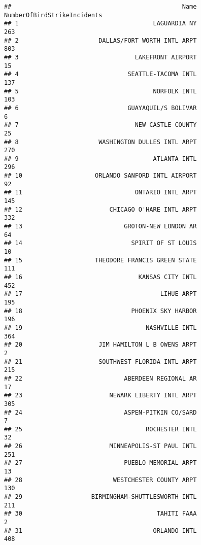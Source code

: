 \documentclass[
]{article}
\begin{document}
\begin{verbatim}
##                                               Name NumberOfBirdStrikeIncidents
## 1                                     LAGUARDIA NY                         263
## 2                      DALLAS/FORT WORTH INTL ARPT                         803
## 3                                LAKEFRONT AIRPORT                          15
## 4                              SEATTLE-TACOMA INTL                         137
## 5                                     NORFOLK INTL                         103
## 6                              GUAYAQUIL/S BOLIVAR                           6
## 7                                NEW CASTLE COUNTY                          25
## 8                      WASHINGTON DULLES INTL ARPT                         270
## 9                                     ATLANTA INTL                         296
## 10                    ORLANDO SANFORD INTL AIRPORT                          92
## 11                               ONTARIO INTL ARPT                         145
## 12                        CHICAGO O'HARE INTL ARPT                         332
## 13                            GROTON-NEW LONDON AR                          64
## 14                              SPIRIT OF ST LOUIS                          10
## 15                    THEODORE FRANCIS GREEN STATE                         111
## 16                                KANSAS CITY INTL                         452
## 17                                      LIHUE ARPT                         195
## 18                              PHOENIX SKY HARBOR                         196
## 19                                  NASHVILLE INTL                         364
## 20                     JIM HAMILTON L B OWENS ARPT                           2
## 21                     SOUTHWEST FLORIDA INTL ARPT                         215
## 22                            ABERDEEN REGIONAL AR                          17
## 23                        NEWARK LIBERTY INTL ARPT                         305
## 24                            ASPEN-PITKIN CO/SARD                           7
## 25                                  ROCHESTER INTL                          32
## 26                        MINNEAPOLIS-ST PAUL INTL                         251
## 27                            PUEBLO MEMORIAL ARPT                          13
## 28                         WESTCHESTER COUNTY ARPT                         130
## 29                   BIRMINGHAM-SHUTTLESWORTH INTL                         211
## 30                                     TAHITI FAAA                           2
## 31                                    ORLANDO INTL                         408

\end{verbatim}
\end{document}
